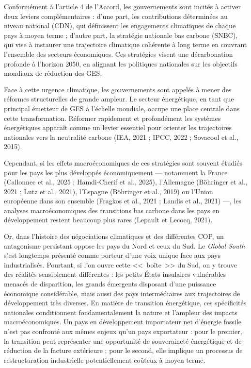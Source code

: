 \documentclass[12pt, a4paper]{article}
\begin{document}
Conformément à l'article 4 de l'Accord, les gouvernements sont incités à activer deux leviers complémentaires : d'une part, les contributions déterminées au niveau national (CDN), qui définissent les engagements climatiques de chaque pays à moyen terme ; d'autre part, la stratégie nationale bas carbone (SNBC), qui vise à instaurer une trajectoire climatique cohérente à long terme en couvrant l'ensemble des secteurs économiques. Ces stratégies visent une décarbonation profonde à l'horizon 2050, en alignant les politiques nationales sur les objectifs mondiaux de réduction des GES.

Face à cette urgence climatique, les gouvernements sont appelés à mener des réformes structurelles de grande ampleur. Le secteur énergétique, en tant que principal émetteur de GES à l'échelle mondiale, occupe une place centrale dans cette transformation. Réformer rapidement et profondément les systèmes énergétiques apparaît comme un levier essentiel pour orienter les trajectoires nationales vers la neutralité carbone (IEA, 2021 ; IPCC, 2022 ; Sovacool et al., 2015).

Cependant, si les effets macroéconomiques de ces stratégies sont souvent étudiés pour les pays les plus développés économiquement --- notamment la France (Callonnec et al., 2025 ; Hamdi-Cherif et al., 2025), l'Allemagne (Böhringer et al., 2021 ; Lutz et al., 2021), l'Espagne (Böhringer et al., 2019) ou l'Union européenne dans son ensemble (Fragkos et al., 2021 ; Landis et al., 2021) ---, les analyses macroéconomiques des transitions bas carbone dans les pays en développement restent beaucoup plus rares (Lepault et Lecocq, 2021).

Or, dans l'histoire des négociations climatiques et des différentes COP, un antagonisme persistant oppose les pays du Nord et ceux du Sud. Le \textit{Global South} s'est longtemps présenté comme porteur d'une voix unique face aux pays industrialisés. Pourtant, si l'on ouvre cette <<~boîte~>> du Sud, on y trouve des réalités sensiblement différentes : les petits États insulaires vulnérables menacés de disparition, les grands émergents disposant d'une puissance économique considérable, mais aussi des pays intermédiaires aux trajectoires de développement très diverses. En matière de transition énergétique, ces spécificités nationales conditionnent fondamentalement la nature et l'ampleur des impacts macroéconomiques. Un pays en développement importateur net d'énergie fossile n'est pas confronté aux mêmes enjeux qu'un pays exportateur : pour le premier, la transition peut représenter une opportunité de souveraineté énergétique et de réduction de la facture extérieure ; pour le second, elle implique un processus de restructuration industrielle potentiellement coûteux à moyen terme.
\end{document}
